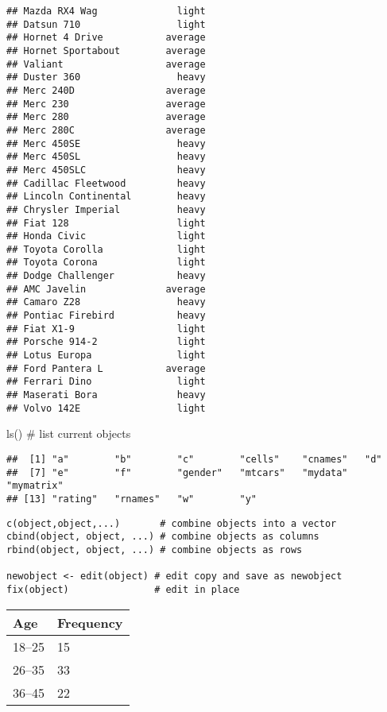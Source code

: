 \documentclass[]{article}
\newenvironment{Shaded}{\begin{snugshade}}{\end{snugshade}}
\newcommand{\KeywordTok}[1]{\textcolor[rgb]{0.94,0.87,0.69}{{#1}}}
\newcommand{\CommentTok}[1]{\textcolor[rgb]{0.50,0.62,0.50}{{#1}}}
\newcommand{\NormalTok}[1]{\textcolor[rgb]{0.80,0.80,0.80}{{#1}}}
\begin{document}
\begin{verbatim}
## Mazda RX4 Wag              light
## Datsun 710                 light
## Hornet 4 Drive           average
## Hornet Sportabout        average
## Valiant                  average
## Duster 360                 heavy
## Merc 240D                average
## Merc 230                 average
## Merc 280                 average
## Merc 280C                average
## Merc 450SE                 heavy
## Merc 450SL                 heavy
## Merc 450SLC                heavy
## Cadillac Fleetwood         heavy
## Lincoln Continental        heavy
## Chrysler Imperial          heavy
## Fiat 128                   light
## Honda Civic                light
## Toyota Corolla             light
## Toyota Corona              light
## Dodge Challenger           heavy
## AMC Javelin              average
## Camaro Z28                 heavy
## Pontiac Firebird           heavy
## Fiat X1-9                  light
## Porsche 914-2              light
## Lotus Europa               light
## Ford Pantera L           average
## Ferrari Dino               light
## Maserati Bora              heavy
## Volvo 142E                 light
\end{verbatim}

\begin{Shaded}
\begin{Highlighting}[]
\KeywordTok{ls}\NormalTok{()   }\CommentTok{# list current objects}
\end{Highlighting}
\end{Shaded}

\begin{verbatim}
##  [1] "a"        "b"        "c"        "cells"    "cnames"   "d"       
##  [7] "e"        "f"        "gender"   "mtcars"   "mydata"   "mymatrix"
## [13] "rating"   "rnames"   "w"        "y"
\end{verbatim}

\begin{verbatim}
c(object,object,...)       # combine objects into a vector
cbind(object, object, ...) # combine objects as columns
rbind(object, object, ...) # combine objects as rows 

newobject <- edit(object) # edit copy and save as newobject 
fix(object)               # edit in place
\end{verbatim}

\begin{tabular}{|l|l|}\hline
Age & Frequency \\ \hline
18--25  & 15 \\
26--35  & 33 \\
36--45  & 22 \\ \hline
\end{tabular}
\end{document}
